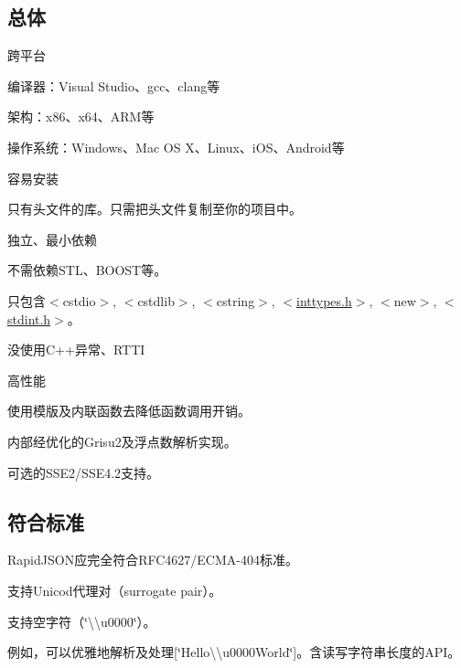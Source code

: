 \subsection*{总体}


\begin{DoxyItemize}
\item 跨平台
\begin{DoxyItemize}
\item 编译器：\+Visual Studio、gcc、clang等
\item 架构：x86、x64、\+A\+R\+M等
\item 操作系统：\+Windows、\+Mac OS X、\+Linux、i\+O\+S、\+Android等
\end{DoxyItemize}
\item 容易安装
\begin{DoxyItemize}
\item 只有头文件的库。只需把头文件复制至你的项目中。
\end{DoxyItemize}
\item 独立、最小依赖
\begin{DoxyItemize}
\item 不需依赖\+S\+T\+L、\+B\+O\+O\+S\+T等。
\item 只包含{\ttfamily $<$cstdio$>$}, {\ttfamily $<$cstdlib$>$}, {\ttfamily $<$cstring$>$}, {\ttfamily $<$\hyperlink{inttypes_8h_source}{inttypes.\+h}$>$}, {\ttfamily $<$new$>$}, {\ttfamily $<$\hyperlink{stdint_8h_source}{stdint.\+h}$>$}。
\end{DoxyItemize}
\item 没使用\+C++异常、\+R\+T\+TI
\item 高性能
\begin{DoxyItemize}
\item 使用模版及内联函数去降低函数调用开销。
\item 内部经优化的\+Grisu2及浮点数解析实现。
\item 可选的\+S\+S\+E2/\+S\+S\+E4.2支持。
\end{DoxyItemize}
\end{DoxyItemize}

\subsection*{符合标准}


\begin{DoxyItemize}
\item Rapid\+J\+S\+O\+N应完全符合\+R\+F\+C4627/\+E\+C\+M\+A-\/404标准。
\item 支持\+Unicod代理对（surrogate pair）。
\item 支持空字符（{\ttfamily \char`\"{}\textbackslash{}\textbackslash{}u0000\char`\"{}}）。
\begin{DoxyItemize}
\item 例如，可以优雅地解析及处理{\ttfamily \mbox{[}\char`\"{}\+Hello\textbackslash{}\textbackslash{}u0000\+World\char`\"{}\mbox{]}}。含读写字符串长度的\+A\+P\+I。
\end{DoxyItemize}
\end{DoxyItemize}


